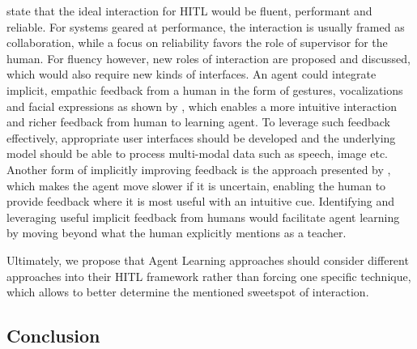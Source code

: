\documentclass[twoside,11pt]{article}
\begin{document}
\citet{WuEtAl:2021:HITLMLSurvey} state that the ideal interaction for HITL would be fluent, performant and reliable. For systems geared at performance, the interaction is usually framed as collaboration, while a focus on reliability favors the role of supervisor for the human. For fluency however, new roles of interaction are proposed and discussed, which would also require new kinds of interfaces. An agent could integrate implicit, empathic feedback from a human in the form of gestures, vocalizations and facial expressions as shown by \citet{CuiEtAl:2020:EMPATHICFrameworkHumanFeedback}, which enables a more intuitive interaction and richer feedback from human to learning agent. To leverage such feedback effectively, appropriate user interfaces should be developed and the underlying model should be able to process multi-modal data such as speech, image etc. Another form of implicitly improving feedback is the approach presented by \citet{PengEtAl:2016:AdaptingAgentSpeed}, which makes the agent move slower if it is uncertain, enabling the human to provide feedback where it is most useful with an intuitive cue. Identifying and leveraging useful implicit feedback from humans would facilitate agent learning by moving beyond what the human explicitly mentions as a teacher.

Ultimately, we propose that Agent Learning approaches should consider different approaches into their HITL framework rather than forcing one specific technique, which allows to better determine the mentioned sweetspot of interaction.

\subsection{Conclusion}

\end{document}
